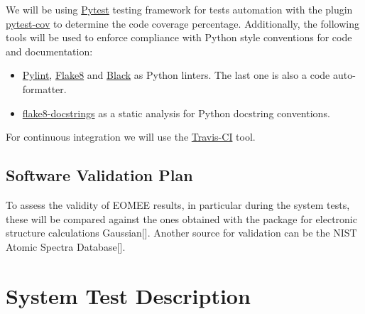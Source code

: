 \documentclass[12pt, titlepage]{article}
\begin{document}
We will be using \href{https://docs.pytest.org/en/stable/} 
{Pytest} testing framework for tests automation  with the plugin 
\href{https://pytest-cov.readthedocs.io/en/latest/} {pytest-cov} to 
determine the code coverage percentage. Additionally, the following tools 
will be 
used to enforce compliance with Python style 
conventions for code and documentation:
\begin{itemize}
\item \href{https://www.pylint.org/} {Pylint}, 
\href{https://flake8.pycqa.org/en/latest/} {Flake8} and 
\href{https://black.readthedocs.io/en/stable/#} {Black} as Python linters. The 
last one is also a code auto-formatter. 
\item \href{https://pypi.org/project/flake8-docstrings/} {flake8-docstrings} as 
a static analysis for Python docstring conventions.
\end{itemize}
For continuous integration we will use the \href{https://travis-ci.org/} 
{Travis-CI} tool.

\subsection{Software Validation Plan}

To assess the validity of EOMEE results, in particular during the system tests, 
these will be compared against the ones obtained with the package for 
electronic structure calculations Gaussian[\cite{g16}]. Another source for 
validation can be the NIST Atomic Spectra 
Database[\cite{NIST_ASD}].

\section{System Test Description}
	
\end{document}
